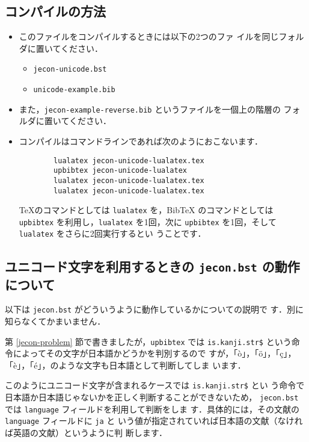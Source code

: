 \documentclass{ltjsarticle}
\begin{document}
\subsection{コンパイルの方法}

\begin{itemize}
 \item このファイルをコンパイルするときには以下の2つのファ
       イルを同じフォルダに置いてください．
       \begin{itemize}
        \item \texttt{jecon-unicode.bst}
        \item \texttt{unicode-example.bib}
       \end{itemize}
 \item また，\texttt{jecon-example-reverse.bib} というファイルを一個上の階層の
       フォルダに置いてください．
 \item コンパイルはコマンドラインであれば次のようにおこないます．
\begin{verbatim}
        lualatex jecon-unicode-lualatex.tex
        upbibtex jecon-unicode-lualatex
        lualatex jecon-unicode-lualatex.tex               
        lualatex jecon-unicode-lualatex.tex
\end{verbatim}
       \TeX のコマンドとしては \texttt{lualatex} を，BibTeX のコマンドとしては
       \texttt{upbibtex} を利用し，\texttt{lualatex} を1回，次に
       \texttt{upbibtex} を1回，そして \texttt{lualatex} をさらに2回実行するとい
       うことです．
\end{itemize}

\subsection{ユニコード文字を利用するときの \texttt{jecon.bst} の動作について}

以下は \texttt{jecon.bst} がどういうように動作しているかについての説明で
す．別に知らなくてかまいません．

\vspace*{1em}

第 \ref{jecon-problem} 節で書きましたが，\texttt{upbibtex} では
\texttt{is.kanji.str\$} という命令によってその文字が日本語かどうかを判別するので
すが，「ò」，「ö」，「ç」，「è」，「é」，のような文字も日本語として判断してしま
います．

このようにユニコード文字が含まれるケースでは \texttt{is.kanji.str\$} とい
う命令で日本語か日本語じゃないかを正しく判断することができないため，
\texttt{jecon.bst} では \texttt{language} フィールドを利用して判断をしま
す．具体的には，その文献の \texttt{language} フィールドに \texttt{ja} と
いう値が指定されていれば日本語の文献（なければ英語の文献）というように判
断します．
\end{document}
